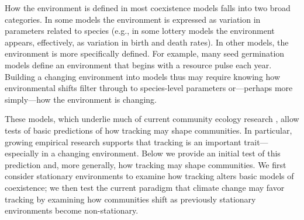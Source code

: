 \documentclass[11pt,letterpaper]{article}
\begin{document}
How the environment is defined in most coexistence models falls into two broad categories. In some models the environment is expressed as variation in parameters related to species (e.g., in some lottery models the environment appears, effectively, as variation in birth and death rates). In other models, the environment is more specifically defined. For example, many seed germination models define an environment that begins with a resource pulse each year. Building a changing environment into models thus may require knowing how environmental shifts filter through to species-level parameters \citep{Tuljapurkar2009} or---perhaps more simply---how the environment is changing. %

These models, which underlie much of current community ecology research \citep{Mayfield:2010fe,barabas2018,ellner2019}, allow tests of basic predictions of how tracking may shape communities. In particular, growing empirical research supports that tracking is an important trait---especially in a changing environment. Below we provide an initial test of this prediction and, more generally, how tracking may shape communities. We first consider stationary environments to examine how tracking alters basic models of coexistence; we then test the current paradigm that climate change may favor tracking by examining how communities shift as previously stationary environments become non-stationary.
\end{document}
